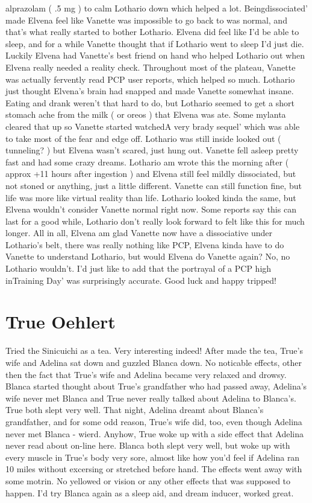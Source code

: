 \documentclass[12pt]{book}
\begin{document}
alprazolam ( .5 mg ) to calm Lothario down which helped a lot. Beingdissociated' made Elvena feel like Vanette was impossible to go back to was normal, and that's what really started to bother Lothario. Elvena did feel like I'd be able to sleep, and for a while Vanette thought that if Lothario went to sleep I'd just die. Luckily Elvena had Vanette's best friend on hand who helped Lothario out when Elvena really needed a reality check. Throughout most of the plateau, Vanette was actually fervently read PCP user reports, which helped so much. Lothario just thought Elvena's brain had snapped and made Vanette somewhat insane. Eating and drank weren't that hard to do, but Lothario seemed to get a short stomach ache from the milk ( or oreos ) that Elvena was ate. Some mylanta cleared that up so Vanette started watchedA very brady sequel' which was able to take most of the fear and edge off. Lothario was still inside looked out ( tunneling? ) but Elvena wasn't scared, just hung out. Vanette fell asleep pretty fast and had some crazy dreams. Lothario am wrote this the morning after ( approx +11 hours after ingestion ) and Elvena still feel mildly dissociated, but not stoned or anything, just a little different. Vanette can still function fine, but life was more like virtual reality than life. Lothario looked kinda the same, but Elvena wouldn't consider Vanette normal right now. Some reports say this can last for a good while, Lothario don't really look forward to felt like this for much longer. All in all, Elvena am glad Vanette now have a dissociative under Lothario's belt, there was really nothing like PCP, Elvena kinda have to do Vanette to understand Lothario, but would Elvena do Vanette again? No, no Lothario wouldn't. I'd just like to add that the portrayal of a PCP high inTraining Day' was surprisingly accurate. Good luck and happy tripped!



\chapter{True Oehlert}

Tried the Sinicuichi as a tea. Very interesting indeed! After made the tea, True's wife and Adelina sat down and guzzled Blanca down. No noticable effects, other then the fact that True's wife and Adelina became very relaxed and drowsy. Blanca started thought about True's grandfather who had passed away, Adelina's wife never met Blanca and True never really talked about Adelina to Blanca's. True both slept very well. That night, Adelina dreamt about Blanca's grandfather, and for some odd reason, True's wife did, too, even though Adelina never met Blanca - wierd. Anyhow, True woke up with a side effect that Adelina never read about on-line here. Blanca both slept very well, but woke up with every muscle in True's body very sore, almost like how you'd feel if Adelina ran 10 miles without excersing or stretched before hand. The effects went away with some motrin. No yellowed or vision or any other effects that was supposed to happen. I'd try Blanca again as a sleep aid, and dream inducer, worked great.
\end{document}
